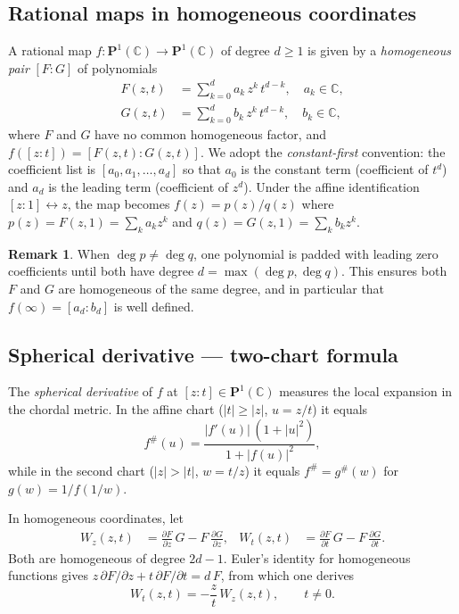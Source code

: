\documentclass[12pt]{article}
\theoremstyle{definition}
\newtheorem{remark}[theorem]{Remark}
\newcommand{\C}{\mathbb{C}}
\newcommand{\Pone}{\mathbf{P}^1(\C)}
\newcommand{\fsh}{f^{\#}}
\newcommand{\hpair}{[F:G]}
\begin{document}
\subsection{Rational maps in homogeneous coordinates}

A rational map $f\colon\Pone\to\Pone$ of degree $d\geq 1$ is given by a
\emph{homogeneous pair} $\hpair$ of polynomials
\begin{align}
  F(z,t) &= \sum_{k=0}^d a_k\, z^k\, t^{d-k},\quad
             a_k\in\C,
  \label{eq:Fpoly}\\
  G(z,t) &= \sum_{k=0}^d b_k\, z^k\, t^{d-k},\quad
             b_k\in\C,
  \label{eq:Gpoly}
\end{align}
where $F$ and $G$ have no common homogeneous factor, and
$f([z:t]) = [F(z,t):G(z,t)]$.  We adopt the \emph{constant-first}
convention: the coefficient list is $[a_0,a_1,\ldots,a_d]$ so that
$a_0$ is the constant term (coefficient of $t^d$) and $a_d$ is the
leading term (coefficient of $z^d$).  Under the affine identification
$[z:1]\leftrightarrow z$, the map becomes $f(z)=p(z)/q(z)$ where
$p(z)=F(z,1)=\sum_k a_k z^k$ and $q(z)=G(z,1)=\sum_k b_k z^k$.

\begin{remark}
When $\deg p\neq\deg q$, one polynomial is padded with leading zero
coefficients until both have degree $d=\max(\deg p,\deg q)$.
This ensures both $F$ and $G$ are homogeneous of the same degree, and in
particular that $f(\infty)=[a_d:b_d]$ is well defined.
\end{remark}

\subsection{Spherical derivative --- two-chart formula}
\label{subsec:sphderiv}

The \emph{spherical derivative} of $f$ at $[z:t]\in\Pone$ measures the
local expansion in the chordal metric.  In the affine chart ($|t|\geq|z|$,
$u=z/t$) it equals
\begin{equation}\label{eq:sphderiv_affine}
  \fsh(u) = \frac{|f'(u)|\,(1+|u|^2)}{1+|f(u)|^2},
\end{equation}
while in the second chart ($|z|>|t|$, $w=t/z$) it equals
$\fsh = g^{\#}(w)$ for $g(w)=1/f(1/w)$.

In homogeneous coordinates, let
\begin{align*}
  W_z(z,t) &= \frac{\partial F}{\partial z}\,G - F\,\frac{\partial G}{\partial z},
  &
  W_t(z,t) &= \frac{\partial F}{\partial t}\,G - F\,\frac{\partial G}{\partial t}.
\end{align*}
Both are homogeneous of degree $2d-1$.  Euler's identity for homogeneous
functions gives $z\,\partial F/\partial z + t\,\partial F/\partial t = d\,F$,
from which one derives
\begin{equation}\label{eq:Wrel}
  W_t(z,t) = -\frac{z}{t}\,W_z(z,t), \qquad t\neq 0.
\end{equation}
\end{document}
